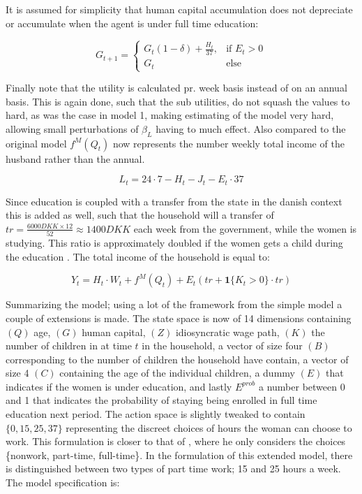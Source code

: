It is assumed for simplicity that human capital accumulation does not depreciate or accumulate when the agent is under full time education:

\begin{equation}
    G_{t+1} = 
    \begin{cases}
        G_t(1 - \delta) + \frac{H_t}{37}, & \text{if } E_t > 0 \\
        G_t & \text{else}
    \end{cases}
\end{equation}


Finally note that the utility is calculated pr. week basis instead of on an annual basis. This is again done, such that the sub utilities, do not squash the values to hard, as was the case in model 1, making estimating of the model very hard, allowing small perturbations of $\beta_L$ having to much effect. Also compared to the original model $f^M(Q_t)$ now represents the number weekly total income of the husband rather than the annual.

\begin{equation}
    L_t = 24 \cdot 7 - H_t - J_t - E_t \cdot 37
\end{equation}

Since education is coupled with a transfer from the state in the danish context this is added as well, such that the household will a transfer of $tr = \frac{6000 DKK \times 12}{52} \approx 1400 DKK$ each week from the government, while the women is studying. This ratio is approximately doubled if the women gets a child during the education \parencite{noauthor_satser_nodate-1}. The total income of the household is equal to:

\begin{equation}
    Y_t = H_t \cdot W_t + f^M(Q_t) + E_t (tr + \mathbf{1} \{ K_t > 0 \} \cdot tr)  
\end{equation}


Summarizing the model; using a lot of the framework from the simple model a couple of extensions is made. The state space is now of 14 dimensions containing $(Q)$ age, $(G)$ human capital, $(Z)$ idiosyncratic wage path, $(K)$ the number of children in at time $t$ in the household, a vector of size four $(B)$ corresponding to the number of children the household have contain, a vector of size 4 $(C)$ containing the age of the individual children, a dummy $(E)$ that indicates if the women is under education, and lastly $E^{prob}$ a number between 0 and 1 that indicates the probability of staying being enrolled in full time education next period. The action space is slightly tweaked to contain $\{ 0, 15, 25, 37\}$ representing the discreet choices of hours the woman can choose to work. This formulation is closer to that of \textcite{francesconi_joint_2002}, where he only considers the choices \{nonwork, part-time, full-time\}. In the formulation of this extended model, there is distinguished between two types of part time work; 15 and 25 hours a week. The model specification is:

